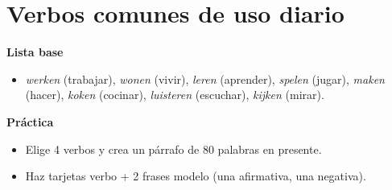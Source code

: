 \section{Verbos comunes de uso diario}
\textbf{Lista base}
\begin{itemize}[leftmargin=*]
  \item \textit{werken} (trabajar), \textit{wonen} (vivir), \textit{leren} (aprender), \textit{spelen} (jugar), \textit{maken} (hacer), \textit{koken} (cocinar), \textit{luisteren} (escuchar), \textit{kijken} (mirar).
\end{itemize}

\textbf{Práctica}
\begin{itemize}[leftmargin=*]
  \item Elige 4 verbos y crea un párrafo de 80 palabras en presente.
  \item Haz tarjetas verbo + 2 frases modelo (una afirmativa, una negativa).
\end{itemize}
